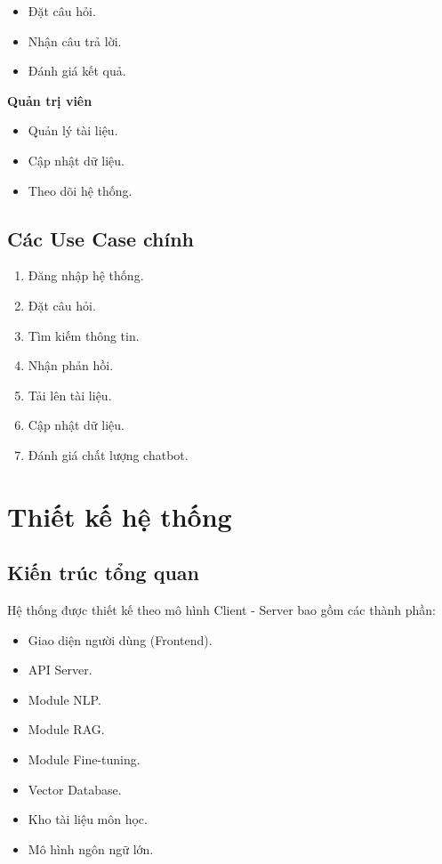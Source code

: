 \documentclass[12pt,a4paper]{report}
\begin{document}
	\begin{itemize}
		\item Đặt câu hỏi.
		\item Nhận câu trả lời.
		\item Đánh giá kết quả.
	\end{itemize}
	
	\textbf{Quản trị viên}
	
	\begin{itemize}
		\item Quản lý tài liệu.
		\item Cập nhật dữ liệu.
		\item Theo dõi hệ thống.
	\end{itemize}
	
	\subsection{Các Use Case chính}
	
	\begin{enumerate}
		\item Đăng nhập hệ thống.
		\item Đặt câu hỏi.
		\item Tìm kiếm thông tin.
		\item Nhận phản hồi.
		\item Tải lên tài liệu.
		\item Cập nhật dữ liệu.
		\item Đánh giá chất lượng chatbot.
	\end{enumerate}
	
	\section{Thiết kế hệ thống}
	
	\subsection{Kiến trúc tổng quan}
	
	Hệ thống được thiết kế theo mô hình Client - Server bao gồm các thành phần:
	
	\begin{itemize}
		\item Giao diện người dùng (Frontend).
		\item API Server.
		\item Module NLP.
		\item Module RAG.
		\item Module Fine-tuning.
		\item Vector Database.
		\item Kho tài liệu môn học.
		\item Mô hình ngôn ngữ lớn.
	\end{itemize}
	
\end{document}
